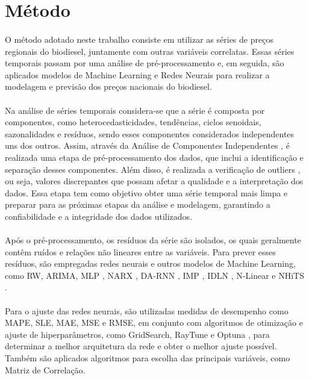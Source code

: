 \section{Método}

\paragraph{} O método adotado neste trabalho consiste em utilizar as séries de preços regionais do biodiesel, juntamente com outras variáveis correlatas. Essas séries temporais passam por uma análise de pré-processamento e, em seguida, são aplicados modelos de Machine Learning e Redes Neurais para realizar a modelagem e previsão dos preços nacionais do biodiesel.

\paragraph{} Na análise de séries temporais considera-se que a série é composta por componentes, como heterocedasticidades, tendências, ciclos senoidais, sazonalidades e resíduos, sendo esses componentes considerados independentes uns dos outros. Assim, através da Análise de Componentes Independentes \cite{Faier11}, é realizada uma etapa de pré-processamento dos dados, que inclui a identificação e separação desses componentes. Além disso, é realizada a verificação de outliers \cite{Dantas07}, ou seja, valores discrepantes que possam afetar a qualidade e a interpretação dos dados. Essa etapa tem como objetivo obter uma série temporal mais limpa e preparar para as próximas etapas da análise e modelagem, garantindo a confiabilidade e a integridade dos dados utilizados.


\paragraph{}Após o pré-processamento, os resíduos da série são isolados, os quais geralmente contêm ruídos e relações não lineares entre as variáveis. Para prever esses resíduos, são empregadas redes neurais e outros modelos de Machine Learning, como \ac{RW}, \ac{ARIMA}, \ac{MLP} \cite{haykin2009neural}, \ac{NARX} \cite{haykin1998neural}, \ac{DA-RNN} \cite{zheng2017forecasting}, \ac{IMP} \cite{araujo_morphological_2012}, \ac{IDLN} \cite{Araujo16}, \ac{N-Linear} \cite{DLinear22} e \ac{NHiTS} \cite{NHiTS22}.

\paragraph{}Para o ajuste das redes neurais, são utilizadas medidas de desempenho como \ac{MAPE}, \ac{SLE}, \ac{MAE}, \ac{MSE} e \ac{RMSE}, em conjunto com algoritmos de otimização e ajuste de hiperparâmetros, como GridSearch, RayTune \cite{RayTune18} e Optuna \cite{optuna_2019}, para determinar a melhor arquitetura da rede e obter o melhor ajuste possível. Também são aplicados algoritmos para escolha das principais variáveis, como Matriz de Correlação.

